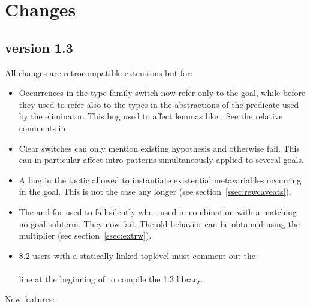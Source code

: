 \iffalse

\section{Changes}

\subsection{\ssr{} version 1.3}
All changes are retrocompatible extensions but for:
\begin{itemize}
\item Occurrences in the type family switch now refer only to the goal, while
      before they used to refer also to the types in the abstractions of the
      predicate used by the eliminator. This bug used to affect lemmas like
      . See the relative comments in .
\item Clear switches can only mention existing hypothesis and
      otherwise fail. This can in particular affect intro patterns
      simultaneously applied to several goals.
\item A bug in the  tactic allowed to
      instantiate existential metavariables occurring in the goal.
      This is not the case any longer (see section~\ref{ssec:rewcaveats}).
\item The  and   for  used to
      fail silently when used in combination with a  matching no
      goal subterm. They now fail. The old behavior can be obtained using
      the  multiplier (see section~\ref{ssec:extrw}).
\item \Coq{} 8.2 users with a statically linked toplevel must comment out the\\
      \\
      line at the beginning of  to compile the 1.3 library.
\end{itemize}
New features:
